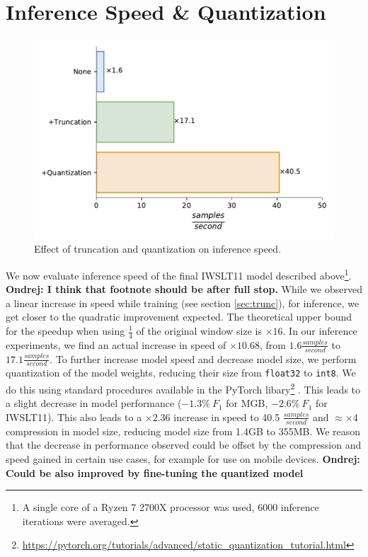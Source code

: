 \documentclass[bsc,deptreport,ai]{infthesis} %
\newcommand{\Ondrej}[1]{{\color{red} \textbf{Ondrej: #1}}}
\begin{document}
\section{Inference Speed \& Quantization}
\begin{figure}[!htb]
\centering
\includegraphics[width=.7\textwidth]{speedup.pdf}
\caption{Effect of truncation and quantization on inference speed.}
\label{fig:truncquant}
\end{figure}
We now evaluate inference speed of the final IWSLT11 model described above\footnote{A single core of a Ryzen 7 2700X processor was used, 6000 inference iterations were averaged.}. \Ondrej{I think that footnote should be after full stop.} While we observed a linear increase in speed while training (see section \ref{sec:trunc}), for inference, we get closer to the quadratic improvement expected. The theoretical upper bound for the speedup when using $\frac{1}{4}$ of the original window size is $\times16$. In our inference experiments, we find an actual increase in speed of $\times10.68$, from $1.6\frac{samples}{second}$ to $17.1\frac{samples}{second}$. To further increase model speed and decrease model size, we perform quantization of the model weights, reducing their size from \texttt{float32} to \texttt{int8}. We do this using standard procedures available in the PyTorch libary\footnote{\url{https://pytorch.org/tutorials/advanced/static_quantization_tutorial.html}} \citep{pytorch}. This leads to a slight decrease in model performance ($-1.3\%~F_1$ for MGB, $-2.6\%~F_1$ for IWSLT11). This also leads to a $\times2.36$ increase in speed to 40.5 $\frac{samples}{second}$ and $\approx\times4$ compression in model size, reducing model size from 1.4GB to 355MB. We reason that the decrease in performance observed could be offset by the compression and speed gained in certain use cases, for example for use on mobile devices.\Ondrej{Could be also improved by fine-tuning the quantized model}
\end{document}
